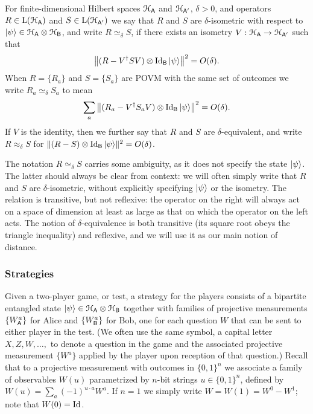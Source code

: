 \begin{definition}
For finite-dimensional Hilbert spaces $\mathcal{H}_{{\textsf{A}}}$ and $\mathcal{H}_{{\textsf{A}}'}$, $\delta>0$, and operators $R \in\mathrm{L}(\mathcal{H}_{{\textsf{A}}})$ and $S\in\mathrm{L}(\mathcal{H}_{{\textsf{A}}'})$ we say that $R$ and $S$ are $\delta$-isometric with respect to $|\psi\rangle \in \mathcal{H}_{{\textsf{A}}} \otimes \mathcal{H}_{{\textsf{B}}}$, and write $R\simeq_\delta S$, if there exists an isometry $V:\mathcal{H}_{{\textsf{A}}}\to\mathcal{H}_{{\textsf{A}}'}$ such that 
$$\big\|( R-V^\dagger SV)\otimes \mathop{\rm Id}\nolimits_{{\textsf{B}}} |\psi\rangle\big\|^2=O(\delta).$$
When $R = \{R_a\}$ and $S=\{S_a\}$ are POVM with the same set of outcomes we write $R_a \simeq_\delta S_a$ to mean
$$\sum_a \big\|( R_a-V^\dagger S_a V)\otimes \mathop{\rm Id}\nolimits_{{\textsf{B}}} |\psi\rangle\big\|^2=O(\delta).$$
If $V$ is the identity, then we further say that $R$ and $S$ are $\delta$-equivalent, and write $R\approx_\delta S$ for $\| ( R- S) \otimes \mathop{\rm Id}\nolimits_{{\textsf{B}}} |\psi\rangle\|^2=O(\delta)$.
\end{definition}

The notation $R\simeq_\delta S$ carries some ambiguity, as it does not specify the state $|\psi\rangle$. The latter should always be clear from context: we will often simply write that $R$ and $S$ are $\delta$-isometric, without explicitly specifying $|\psi\rangle$ or the isometry. The relation is transitive, but not reflexive: the operator on the right will always act on a space of dimension at least as large as that on which the operator on the left acts. The notion of $\delta$-equivalence is both transitive (its square root obeys the triangle inequality) and reflexive, and we will use it as our main notion of distance. 

\subsubsection{Strategies}

Given a two-player game, or test, a strategy for the players consists of a bipartite entangled state $|\psi\rangle \in \mathcal{H}_{\textsf{A}} \otimes \mathcal{H}_{\textsf{B}}$ together with families of projective  measurements $\{W^a_{\textsf{A}}\}$ for Alice and $\{W_{\textsf{B}}^a\}$ for Bob, one for each question $W$ that can be sent to either player in the test. (We often use the same symbol, a capital letter $X,Z,W,\ldots,$ to denote a question in the game and the associated projective measurement $\{W^a\}$ applied by the player upon reception of that question.) 
 Recall that to a projective measurement with outcomes in $\{0,1\}^n$ we  associate a family of observables $W(u)$ parametrized by $n$-bit strings $u\in\{0,1\}^n$, defined by $W(u) = \sum_a (-1)^{u\cdot a} W^a$. If $n=1$ we simply write $W=W(1)=W^0-W^1$; note that $W(0)=\mathop{\rm Id}\nolimits$.

